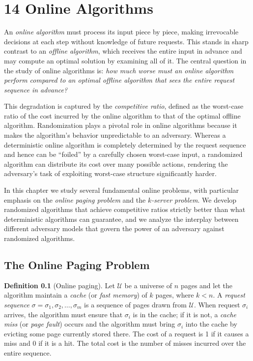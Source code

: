 \documentclass[twoside,12pt]{book}
\theoremstyle{plain}
\theoremstyle{definition}
\newtheorem{definition}[theorem]{Definition}
\theoremstyle{remark}
\begin{document}
\chapter*{14 Online Algorithms}
\label{ch:online-algorithms}

An \emph{online algorithm} must process its input piece by piece, making
irrevocable decisions at each step without knowledge of future requests.
This stands in sharp contrast to an \emph{offline algorithm}, which
receives the entire input in advance and may compute an optimal solution
by examining all of it.  The central question in the study of online
algorithms is: \emph{how much worse must an online algorithm perform
compared to an optimal offline algorithm that sees the entire request
sequence in advance?}

This degradation is captured by the \emph{competitive ratio}, defined as
the worst-case ratio of the cost incurred by the online algorithm to that
of the optimal offline algorithm.  Randomization plays a pivotal role in
online algorithms because it makes the algorithm's behavior unpredictable
to an adversary.  Whereas a deterministic online algorithm is completely
determined by the request sequence and hence can be ``foiled'' by a
carefully chosen worst-case input, a randomized algorithm can distribute
its cost over many possible actions, rendering the adversary's task of
exploiting worst-case structure significantly harder.

In this chapter we study several fundamental online problems, with
particular emphasis on the \emph{online paging problem} and the
\emph{$k$-server problem}.  We develop randomized algorithms that achieve
competitive ratios strictly better than what deterministic algorithms can
guarantee, and we analyze the interplay between different adversary models
that govern the power of an adversary against randomized algorithms.

\section{The Online Paging Problem}
\label{sec:paging}

\begin{definition}[Online paging]
Let $\mathcal{U}$ be a universe of $n$ pages and let the algorithm
maintain a \emph{cache} (or \emph{fast memory}) of $k$ pages, where
$k < n$.  A \emph{request sequence} $\sigma = \sigma_1, \sigma_2,
\ldots, \sigma_m$ is a sequence of pages drawn from $\mathcal{U}$.  When
request $\sigma_i$ arrives, the algorithm must ensure that $\sigma_i$ is
in the cache; if it is not, a \emph{cache miss} (or \emph{page fault})
occurs and the algorithm must bring $\sigma_i$ into the cache by evicting
some page currently stored there.  The cost of a request is 1 if it
causes a miss and 0 if it is a hit.  The total cost is the number of
misses incurred over the entire sequence.
\end{definition}
\end{document}
